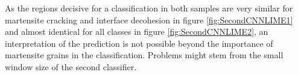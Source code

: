As the regions decisive for a classification in both samples are very similar for martensite cracking and interface decohesion in figure \ref{fig:SecondCNNLIME1} and almost identical for all classes in figure \ref{fig:SecondCNNLIME2}, an interpretation of the prediction is not possible beyond the importance of martensite grains in the classification. Problems might stem from the small window size of the second classifier. \\
%



